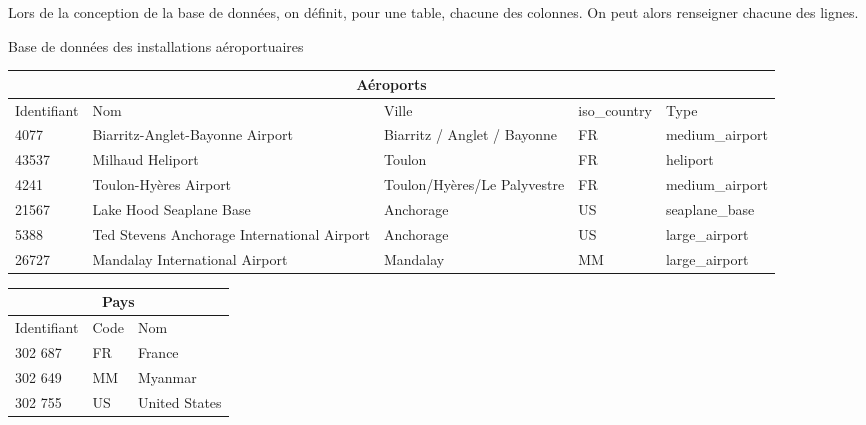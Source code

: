 \documentclass[10pt]{article}
\begin{document}
Lors de la conception de la base de données, on définit, pour une table, chacune des colonnes. On peut alors renseigner chacune des lignes. 

\begin{exemple}
Base de données des installations aéroportuaires
\begin{center}
\begin{tabular}{lp{4cm}p{3cm}ll}
\hline
\multicolumn{5}{c}{Aéroports} \\
\hline
Identifiant & Nom & Ville & iso\_country & Type \\
\hline
\hline
4077 &Biarritz-Anglet-Bayonne Airport & Biarritz / Anglet / Bayonne & FR &  medium\_airport \\
43537 &Milhaud Heliport & Toulon & FR  & heliport \\
4241 &Toulon-Hyères Airport & Toulon/Hyères/Le Palyvestre & FR &  medium\_airport \\
21567 &Lake Hood Seaplane Base & Anchorage & US &   seaplane\_base\\
5388 &Ted Stevens Anchorage International Airport & Anchorage & US & large\_airport\\
26727 &Mandalay International Airport & Mandalay & MM  & large\_airport\\
\hline
\end{tabular}
\end{center}

\begin{center}
\begin{tabular}{lll}
\hline
\multicolumn{3}{c}{Pays} \\
\hline
Identifiant & Code & Nom \\
\hline
\hline
302 687 & FR & France \\
302 649 & MM & Myanmar \\
302 755 & US & United States \\
\hline
\end{tabular}
\end{center}
\end{exemple}
\end{document}
